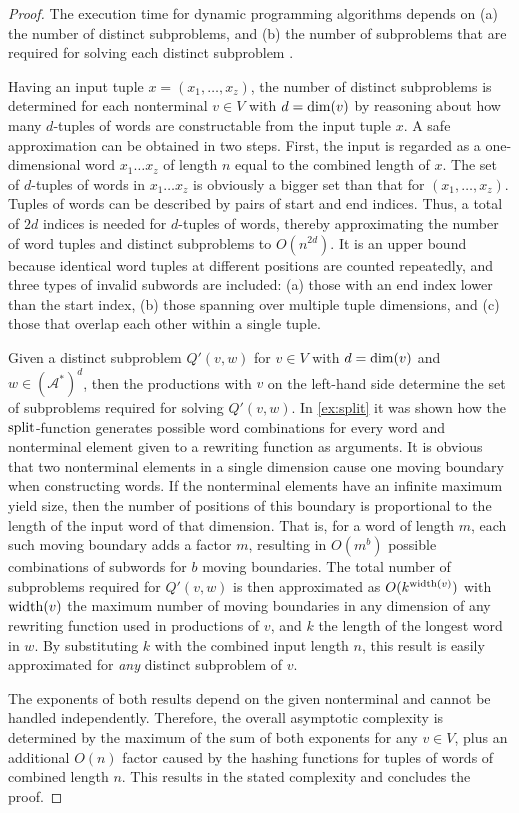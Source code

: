 \documentclass[
    a4paper,
    12pt,
    twoside,
    BCOR=12mm,
    parskip=half,
    chapterprefix,
    numbers=noenddot,
    bibliography=totoc
]{scrbook}
\begin{document}
\begin{proof}
The execution time for dynamic programming algorithms depends on (a) the number of distinct subproblems, and (b) the number of subproblems that are required for solving each distinct subproblem \citep[p. 368]{cormen_introduction_2009}.

Having an input tuple $x=(x_1,\ldots,x_z)$, the number of distinct subproblems is determined for each nonterminal $v \in V$ with $d=\mathrm{dim}(v)$ by reasoning about how many $d$-tuples of words are constructable from the input tuple $x$. A safe approximation can be obtained in two steps. First, the input is regarded as a one-dimensional word $x_1 \ldots x_z$ of length $n$ equal to the combined length of $x$. The set of $d$-tuples of words in $x_1 \ldots x_z$ is obviously a bigger set than that for $(x_1,\ldots,x_z)$. Tuples of words can be described by pairs of start and end indices. Thus, a total of $2d$ indices is needed for $d$-tuples of words, thereby approximating the number of word tuples and distinct subproblems to $O(n^{2d})$. It is an upper bound because identical word tuples at different positions are counted repeatedly, and three types of invalid subwords are included: (a) those with an end index lower than the start index, (b) those spanning over multiple tuple dimensions, and (c) those that overlap each other within a single tuple.

Given a distinct subproblem $Q'(v,w)$ for $v \in V$ with $d=\mathrm{dim}(v)$ and $w \in (\mathcal{A}^*)^d$, then the productions with $v$ on the left-hand side determine the set of subproblems required for solving $Q'(v,w)$. In \cref{ex:split} it was shown how the $\mathrm{split}$-function generates possible word combinations for every word and nonterminal element given to a rewriting function as arguments. It is obvious that two nonterminal elements in a single dimension cause one moving boundary when constructing words. If the nonterminal elements have an infinite maximum yield size, then the number of positions of this boundary is proportional to the length of the input word of that dimension. That is, for a word of length $m$, each such moving boundary adds a factor $m$, resulting in $O(m^b)$ possible combinations of subwords for $b$ moving boundaries. The total number of subproblems required for $Q'(v,w)$ is then approximated as $O(k^{\mathrm{width}(v)})$ with $\mathrm{width}(v)$ the maximum number of moving boundaries in any dimension of any rewriting function used in productions of $v$, and $k$ the length of the longest word in $w$. By substituting $k$ with the combined input length $n$, this result is easily approximated for \emph{any} distinct subproblem of $v$.

The exponents of both results depend on the given nonterminal and cannot be handled independently. Therefore, the overall asymptotic complexity is determined by the maximum of the sum of both exponents for any $v \in V$, plus an additional $O(n)$ factor caused by the hashing functions for tuples of words of combined length $n$. This results in the stated complexity and concludes the proof.
\end{proof}
\end{document}
